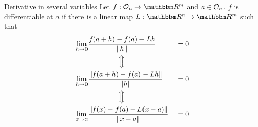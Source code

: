 \documentclass[../Analysis-3]{subfiles}
\begin{document}
\begin{Def}{Derivative in several variables}{}
  Let $ f : {\cal O}_n \to \R^m $ and $ a \in {\cal O}_n $. $ f $ is differentiable at $ a $ if there is a linear map $ L : \R^n \to \R^m $ such that
  \begin{alignat*}{2}
    \lim_{h \to 0} & \frac{f(a+h)-f(a)-Lh}{\norm{h}}            &  & = 0 \\
                   & \qquad \qquad \,\,\Big \Updownarrow                 \\
    \lim_{h \to 0} & \frac{\norm{f(a+h)-f(a)-Lh}}{\norm{h}}     &  & = 0 \\
                   & \qquad \qquad \,\, \Big \Updownarrow                \\
    \lim_{x \to a} & \frac{\norm{f(x)-f(a)-L(x-a)}}{\norm{x-a}} &  & = 0 \\
  \end{alignat*}
\end{Def}
\end{document}

